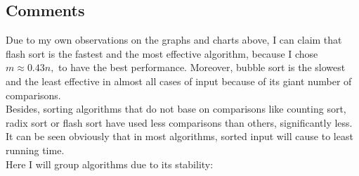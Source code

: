 \documentclass[12pt,a4paper]{article}
\begin{document}
\subsection{Comments}
Due to my own observations on the graphs and charts above, I can claim that flash sort is the fastest and the most effective algorithm, because I chose $m \approx 0.43n,$ to have the best performance. Moreover, bubble sort is the slowest and the least effective in almost all cases of input because of its giant number of comparisons.\\
Besides, sorting algorithms that do not base on comparisons like counting sort, radix sort or flash sort have used less comparisons than others, significantly less.\\
It can be seen obviously that in most algorithms, sorted input will cause to least running time.\\
Here I will group algorithms due to its stability:
\end{document}
